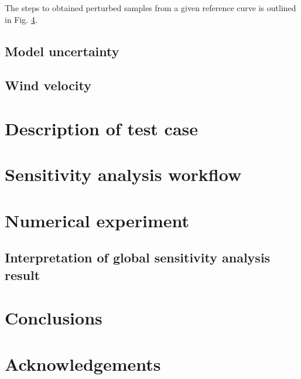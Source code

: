 \documentclass[review]{elsarticle}
\numberwithin{equation}{section}
\numberwithin{equation}{section}
\begin{document}
The steps to obtained perturbed samples from a given reference curve is outlined in Fig. \ref{}.
\subsection{Model uncertainty}
\subsection{Wind velocity}
\section{Description of test case}
\section{Sensitivity analysis workflow}
\section{Numerical experiment}
\subsection{Interpretation of global sensitivity analysis result}
\section{Conclusions}
\section*{Acknowledgements}
\end{document}
